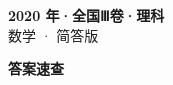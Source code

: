 \documentclass[zihao=-4, a4paper]{ctexart}
\begin{document}
\begin{center}
  {\Large\bfseries 2020 年·全国Ⅲ卷·理科}\\[4pt]
  {\large 数学 · 简答版}
\end{center}
\medskip
{}

\clearpage
{}
\begin{center}{\Large\bfseries 答案速查}\end{center}
\medskip

\end{document}
